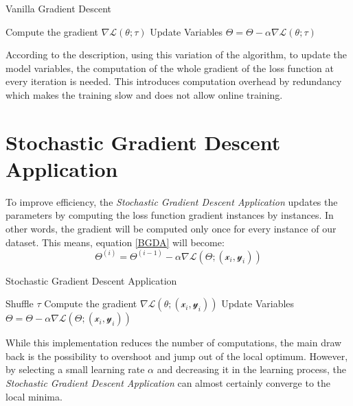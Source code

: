\documentclass[english]{lni}
\begin{document}
\begin{algorithm}
\caption{Vanilla Gradient Descent}\label{euclid}
\begin{algorithmic}[1]
\State Compute the gradient $\nabla\mathscr{L}(\theta;\tau)$
\State Update Variables $\Theta = \Theta -\alpha\nabla\mathscr{L}(\theta;\tau)$
\EndFor
\State {}
\end{algorithmic}
\end{algorithm}

According to the description, using this variation of the algorithm, to update the model variables, the computation of the whole gradient of the loss function at every iteration is needed. This introduces computation overhead by redundancy which makes the training slow and does not allow online training. 
\section{Stochastic Gradient Descent Application}
To improve efficiency, the \textit{Stochastic Gradient Descent Application} updates the parameters by computing the loss function gradient instances by instances. In other words, the gradient will be computed only once for every instance of our dataset. This means, equation \eqref{BGDA} will become:
\begin{equation}
    \Theta^{(i)} = \Theta^{(i-1)} - \alpha\nabla\mathscr{L}(\Theta;(\mathscr{x}_i,\mathscr{y}_i))\label{eq:SGDA}
\end{equation}


\begin{algorithm}
\caption{Stochastic Gradient Descent Application}\label{SGDA}
\begin{algorithmic}[1]
\State Shuffle $\tau$
\State Compute the gradient $\nabla\mathscr{L}(\theta;(\mathscr{x}_i,\mathscr{y}_i))$
\State Update Variables $\Theta = \Theta -\alpha\nabla\mathscr{L}(\Theta;(\mathscr{x}_i,\mathscr{y}_i))$
\EndFor
\EndFor
\State{}
\end{algorithmic}
\end{algorithm}
While this implementation reduces the number of computations, the main draw back is the possibility to overshoot and jump out of the local optimum. However, by selecting a small learning rate $\alpha$ and decreasing it in the learning process, the \textit{Stochastic Gradient Descent Application} can almost certainly converge to the local minima. \cite{JZ2019}
\end{document}
